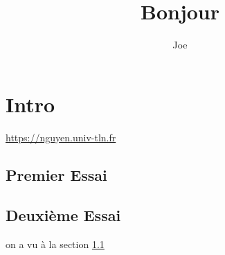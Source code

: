 \documentclass[10pt,a4paper]{scrartcl}
\title{Bonjour}
\author{Joe}
\begin{document}
\maketitle

\begin{abstract}
\lipsum[1]
\end{abstract}
\tableofcontents

\section{Intro}
\url{https://nguyen.univ-tln.fr}
\lipsum[2]
\subsection{Premier Essai}\label{subsec:pe}
\lipsum[3]
\subsection{Deuxième Essai}
\lipsum[4] on a vu à la section \ref{subsec:pe} \pageref{subsec:pe}
\end{document}
